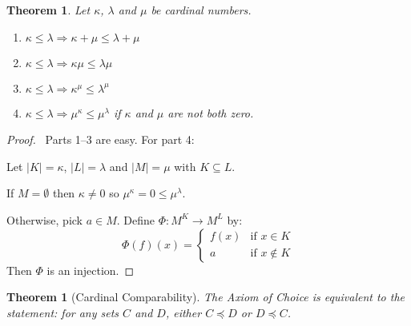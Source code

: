 \documentclass{article}
\let\qed\relax
\newtheorem{theorem}[axiom]{Theorem}
\theoremstyle{definition}
\begin{document}
    \begin{theorem}
        Let $\kappa$, $\lambda$ and $\mu$ be cardinal numbers.
        \begin{enumerate}
            \item $\kappa \leq \lambda \Rightarrow \kappa + \mu \leq \lambda + \mu$
            \item $\kappa \leq \lambda \Rightarrow \kappa \mu \leq \lambda \mu$
            \item $\kappa \leq \lambda \Rightarrow \kappa^\mu \leq \lambda^\mu$
            \item $\kappa \leq \lambda \Rightarrow \mu^\kappa \leq \mu^\lambda$ if $\kappa$ and $\mu$
            are not both zero.
        \end{enumerate}
    \end{theorem}

    \begin{proof}
        \pf\ Parts 1--3 are easy. For part 4:
        
        Let $|K| = \kappa$, $|L| = \lambda$ and $|M| = \mu$ with $K \subseteq L$.

        If $M = \emptyset$ then $\kappa \neq 0$ so $\mu^\kappa = 0 \leq \mu^\lambda$.

        Otherwise, pick $a \in M$. Define $\Phi : M^K \rightarrow M^L$ by:
        \[ \Phi(f)(x) = \begin{cases}
            f(x) & \text{if } x \in K \\
            a & \text{if } x \notin K
        \end{cases} \]
        Then $\Phi$ is an injection. \qed
    \end{proof}

    \begin{theorem}[Cardinal Comparability]
        The Axiom of Choice is equivalent to the statement: for any sets $C$ and $D$,
        either $C \preccurlyeq D$ or $D \preccurlyeq C$.
    \end{theorem}
\end{document}
